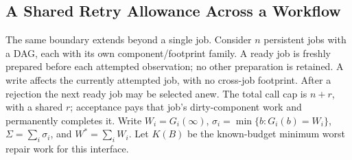 \subsection{A Shared Retry Allowance Across a Workflow}
\label{sec:partialdag}

The same boundary extends beyond a single job. Consider $n$ persistent jobs with a DAG, each with its own component/footprint family. A ready job is freshly prepared before each attempted observation; no other preparation is retained. A write affects the currently attempted job, with no cross-job footprint. After a rejection the next ready job may be selected anew. The total call cap is $n+r$, with a shared $r$; acceptance pays that job's dirty-component work and permanently completes it. Write $W_i=G_i(\infty)$, $\sigma_i=\min\{b:G_i(b)=W_i\}$, $\Sigma=\sum_i\sigma_i$, and $W^*=\sum_iW_i$. Let $K(B)$ be the known-budget minimum worst repair work for this interface.

